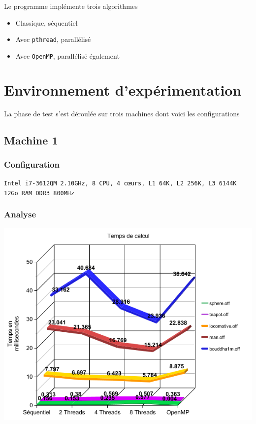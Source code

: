 \documentclass[12pt]{article}
\begin{document}
Le programme implémente trois algorithmes
\begin{itemize}
	\item Classique, séquentiel
	\item Avec \texttt{pthread}\cite{pthreads}, parallélisé
	\item Avec \texttt{OpenMP}, parallélisé également
\end{itemize}

\section{Environnement d'expérimentation}
La phase de test s'est déroulée sur trois machines dont voici les configurations

\subsection{Machine 1}
\subsubsection{Configuration}
\texttt{Intel i7-3612QM 2.10GHz, 8 CPU, 4 cœurs, L1 64K, L2 256K, L3 6144K}
\texttt{12Go RAM DDR3 800MHz}

\subsubsection{Analyse}
\begin{center}
\includegraphics[scale = 0.7]{graph_execTime_machine1.png}
\end{center}
\end{document}
